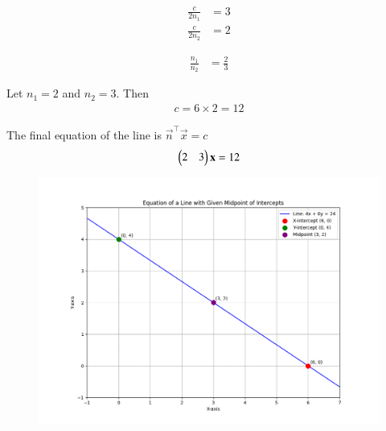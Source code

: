 \documentclass[journal]{IEEEtran}
\begin{document}
\begin{align}
\frac{c}{2n_1} &= 3 \\
\frac{c}{2n_2} &= 2
\end{align}

\begin{align}
\frac{n_1}{n_2} &= \frac{2}{3}
\end{align}

Let $n_1=2$ and $n_2=3$.
Then
\begin{align}
c = 6 \times 2 = 12
\end{align}

The final equation of the line is $\vec{n}^\top \vec{x} = c$
\begin{align}
\begin{pmatrix}2 & 3\end{pmatrix} \mathbf{x} = 12
\end{align}

\begin{figure}[H]
\centering
\includegraphics[width=0.7\columnwidth]{figs/fig1.png}
\caption{}
\label{fig:1}
\end{figure}
\end{document}
